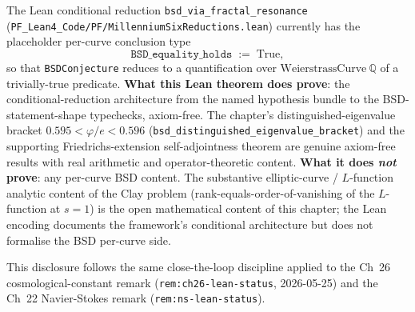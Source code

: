 \begin{remark}\label{rem:bsd-lean-status}
The Lean conditional reduction \texttt{bsd\_via\_fractal\_resonance} (\texttt{PF\_Lean4\_Code/PF/MillenniumSixReductions.lean}) currently has the placeholder per-curve conclusion type
\[
\texttt{BSD\_equality\_holds} \;:=\; \text{True},
\]
so that \texttt{BSDConjecture} reduces to a quantification over $\text{WeierstrassCurve}\ \mathbb{Q}$ of a trivially-true predicate. \textbf{What this Lean theorem does prove}: the conditional-reduction architecture from the named hypothesis bundle to the BSD-statement-shape typechecks, axiom-free. The chapter's distinguished-eigenvalue bracket $0.595 < \varphi/e < 0.596$ (\texttt{bsd\_distinguished\_eigenvalue\_bracket}) and the supporting Friedrichs-extension self-adjointness theorem are genuine axiom-free results with real arithmetic and operator-theoretic content. \textbf{What it does \emph{not} prove}: any per-curve BSD content. The substantive elliptic-curve / $L$-function analytic content of the Clay problem (rank-equals-order-of-vanishing of the $L$-function at $s = 1$) is the open mathematical content of this chapter; the Lean encoding documents the framework's conditional architecture but does not formalise the BSD per-curve side.

This disclosure follows the same close-the-loop discipline applied to the Ch~26 cosmological-constant remark (\texttt{rem:ch26-lean-status}, 2026-05-25) and the Ch~22 Navier-Stokes remark (\texttt{rem:ns-lean-status}).
\end{remark}

